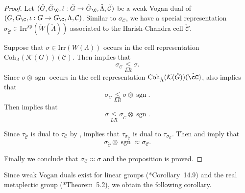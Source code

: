 \documentclass[12pt]{amsart}
\newcommand{\CC}{{\mathcal {C}}}
\newcommand{\CK}{{\mathcal {K}}}
\newcommand{\sgn}{\operatorname{sgn}}
\numberwithin{equation}{section}
\theoremstyle{remark}
\def\Irr{\mathrm{Irr}}
\def\Irrsp{\mathrm{Irr}^{\mathrm{sp}}}
\def\Coh{\mathrm{Coh}}
\def\leqLR{\mathrel{\mathop{\leq}\limits_{\scriptscriptstyle LR}}}
\def\approxLR{\mathrel{\mathop{\approx}\limits^{\scalebox{0.4}{$LR$}}}}
\def\approxLR{\approx}
\begin{document}
\begin{proof}
Let  $(\check G,\check G_\C, \check \iota: \check G\rightarrow \check G_\C, \check \Lambda, \check \CC)$ be a weak Vogan dual of $(G,G_\C, \iota: G\rightarrow G_\C, \Lambda, \CC)$.
Similar to $\sigma_\CC$, we have a special representation $\sigma_{\check \CC}\in \Irrsp{(\check W(\check \Lambda))}$ associated to the Harish-Chandra cell $\check \CC$.



 Suppose that  $\sigma\in \Irr(W(\Lambda))$ occurs in the cell representation $\Coh_{\Lambda}( \CK(G))(\CC)$. Then  implies that
 \[
 \sigma_\CC\leqLR  \sigma.
 \]
Since $\sigma\otimes \sgn$ occurs in the cell representation  $\Coh_{\check \Lambda}(\CK(\check G))(\check \cC)$,  also implies that
\[
\sigma_{\check \CC}\leqLR  \sigma\otimes\sgn.
 \]
 Then  implies that
\[
\sigma\leqLR  \sigma_{\check \CC} \otimes\sgn.
 \]

 Since $\tau_{\check \CC}$ is dual to $\tau_{\CC}$ by ,  implies that $\tau_{\sigma_{\check \CC}}$ is dual to $\tau_{\sigma_{\CC}}$. Then  and  imply that
 \[
   \sigma_{\check \CC}\otimes \sgn \approxLR \sigma_\CC.
 \]

 Finally we conclude that $\sigma_\CC\approxLR \sigma$ and the proposition is proved.
\end{proof}



 Since  weak Vogan duals exist for linear groups (\cite{V4}*{Corollary~14.9}) and  the real metaplectic group (\cite{RT2}*{Theorem~5.2}), we obtain the following corollary.
\end{document}
